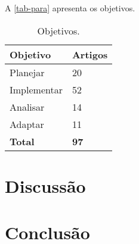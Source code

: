 \documentclass[
article,			%
11pt,				%
oneside,			%
a4paper,			%
english,			%
brazil,				%
sumario=tradicional
]{abntex2}
\begin{document}
  A \autoref{tab-para} apresenta os objetivos.

  \begin{table}[htb]
    \ABNTEXfontereduzida
    \caption[Objetivos]{Objetivos.}
    \label{tab-para}
    \begin{center}
      \begin{tabular}{p{3.0cm}|p{2.0cm}}
        \textbf{Objetivo} & \textbf{Artigos} \\
        \hline
        Planejar & 20 \\
        \hline
        Implementar & 52 \\
        \hline
        Analisar & 14 \\
        \hline
        Adaptar & 11 \\
        \hline
        \textbf{Total} & \textbf{97} \\
      \end{tabular}
    \end{center}
  \end{table}

  \section{Discussão}



  \section{Conclusão}

\end{document}
